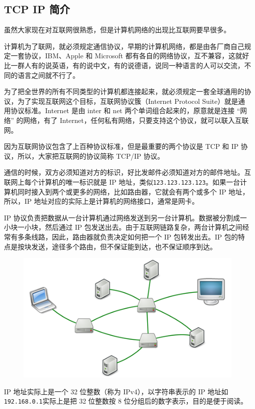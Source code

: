 \hypertarget{tcp-ip-ux7b80ux4ecb}{%
\subsection{TCP IP 简介}\label{tcp-ip-ux7b80ux4ecb}}

虽然大家现在对互联网很熟悉，但是计算机网络的出现比互联网要早很多。

计算机为了联网，就必须规定通信协议，早期的计算机网络，都是由各厂商自己规定一套协议，IBM、Apple
和 Microsoft
都有各自的网络协议，互不兼容，这就好比一群人有的说英语，有的说中文，有的说德语，说同一种语言的人可以交流，不同的语言之间就不行了。

为了把全世界的所有不同类型的计算机都连接起来，就必须规定一套全球通用的协议，为了实现互联网这个目标，互联网协议簇（Internet
Protocol Suite）就是通用协议标准。Internet 是由 inter 和 net
两个单词组合起来的，原意就是连接 ``网络'' 的网络，有了
Internet，任何私有网络，只要支持这个协议，就可以联入互联网。

因为互联网协议包含了上百种协议标准，但是最重要的两个协议是 TCP 和 IP
协议，所以，大家把互联网的协议简称 TCP/IP 协议。

通信的时候，双方必须知道对方的标识，好比发邮件必须知道对方的邮件地址。互联网上每个计算机的唯一标识就是
IP
地址，类似\texttt{123.123.123.123}。如果一台计算机同时接入到两个或更多的网络，比如路由器，它就会有两个或多个
IP 地址，所以，IP 地址对应的实际上是计算机的网络接口，通常是网卡。

IP
协议负责把数据从一台计算机通过网络发送到另一台计算机。数据被分割成一小块一小块，然后通过
IP
包发送出去。由于互联网链路复杂，两台计算机之间经常有多条线路，因此，路由器就负责决定如何把一个
IP 包转发出去。IP
包的特点是按块发送，途径多个路由，但不保证能到达，也不保证顺序到达。

 
 \begin{figure}[htp]
	\centering
	\includegraphics[width=0.6\linewidth]{fig/972515044819040.png}
\end{figure}


IP 地址实际上是一个 32 位整数（称为 IPv4），以字符串表示的 IP
地址如\texttt{192.168.0.1}实际上是把 32 位整数按 8
位分组后的数字表示，目的是便于阅读。

